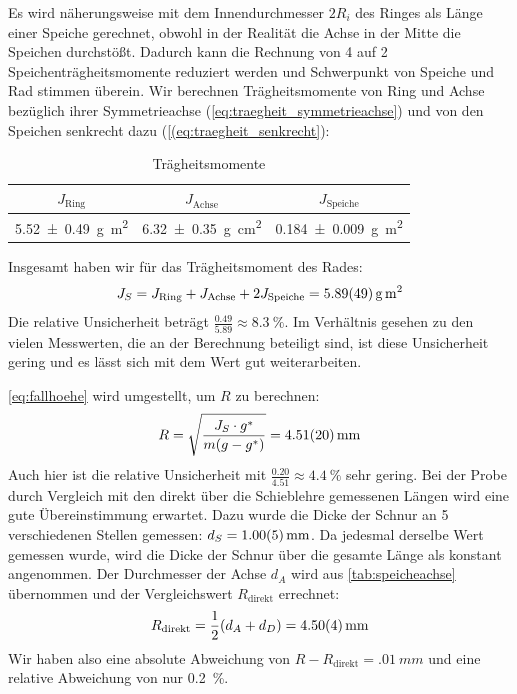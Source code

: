 Es wird näherungsweise mit dem Innendurchmesser $2R_i$ des Ringes als Länge einer Speiche gerechnet, obwohl in der Realität die Achse in der Mitte die Speichen durchstößt. Dadurch kann die Rechnung von 4 auf 2 Speichenträgheitsmomente reduziert werden und Schwerpunkt von Speiche und Rad stimmen überein. Wir berechnen Trägheitsmomente von Ring und Achse bezüglich ihrer Symmetrieachse (\cref{eq:traegheit_symmetrieachse}) und von den Speichen senkrecht dazu (\cref{(eq:traegheit_senkrecht}):
\begin{table}[H]
  \centering
  \begin{tabular}{c | c | c}
    $J_{\text{Ring}}$ & $J_{\text{Achse}}$ & $J_{\text{Speiche}}$ \\ \hline
    \SI{5.52\pm .49}{g.m^2} & \SI{6.32\pm .35}{g.cm^2} & \SI{0.184\pm .009}{g.m^2}
  \end{tabular}
  \caption{Trägheitsmomente}
  \label{tab:traegheit_berechnet}
\end{table}
Insgesamt haben wir für das Trägheitsmoment des Rades:
\begin{equation}
  J_S=J_{\text{Ring}}+J_{\text{Achse}}+2J_{\text{Speiche}}=\SI{5.89\pm .49}{g.m^2}
  \label{eq:traegheitgesamt}
\end{equation}
Die relative Unsicherheit beträgt $\frac{0.49}{5.89}\approx \SI{8.3}{\percent}$. Im Verhältnis gesehen zu den vielen Messwerten, die an der Berechnung beteiligt sind, ist diese Unsicherheit gering und es lässt sich mit dem Wert gut weiterarbeiten.

\cref{eq:fallhoehe} wird umgestellt, um $R$ zu berechnen:
\begin{equation}
  R=\sqrt{\frac{J_S\cdot g^*}{m(g-g^*)}}=\SI{4.51\pm .20}{mm}
  \label{eq:abrollradius}
\end{equation}
Auch hier ist die relative Unsicherheit mit $\frac{0.20}{4.51}\approx \SI{4.4}{\percent}$ sehr gering. Bei der Probe durch Vergleich mit den direkt über die Schieblehre gemessenen Längen wird eine gute Übereinstimmung erwartet.
Dazu wurde die Dicke der Schnur an 5 verschiedenen Stellen gemessen: $d_S=\SI{1\pm0.05}{mm}$. Da jedesmal derselbe Wert gemessen wurde, wird die Dicke der Schnur über die gesamte Länge als konstant angenommen. Der Durchmesser der Achse $d_A$ wird aus \cref{tab:speicheachse} übernommen und der Vergleichswert $R_{\text{direkt}}$ errechnet:
\begin{equation}
  R_{\text{direkt}}=\frac{1}{2}(d_A+d_D)=\SI{4.50\pm .04}{mm}
  \label{eq:vergleichswert}
\end{equation}
Wir haben also eine absolute Abweichung von $R-R_{\text{direkt}}=\SI{.01}{mm}$ und eine relative Abweichung von nur \SI{.2}{\percent}.
